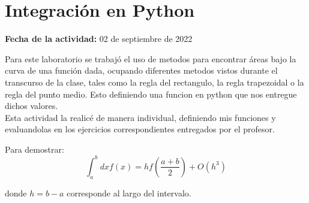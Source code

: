 \documentclass[../portafolio.tex]{subfiles}
\begin{document}


\section{Integraci\'on en Python}   %

\hfill \textbf{Fecha de la actividad:} 02 de septiembre de 2022

\medskip

Para este laboratorio se trabaj\'o el uso de metodos para encontrar \'areas bajo la curva de una funci\'on dada, ocupando diferentes metodos vistos durante el transcurso de la clase, tales como la regla del rectangulo, la regla trapezoidal o la regla del punto medio. Esto definiendo una funcion en python que nos entregue dichos valores.\\
Esta actividad la realic\'e de manera individual, definiendo mis funciones y evaluandolas en los ejercicios correspondientes entregados por el profesor.

Para demostrar:
\begin{equation}
\int_{a}^{b} dx f(x) = h f\left(\frac{a+b}{2}\right) + O(h^3) \label{eq:integralprin}
\end{equation}

donde $h=b-a$ corresponde al largo del intervalo.
\medskip
\end{document}
